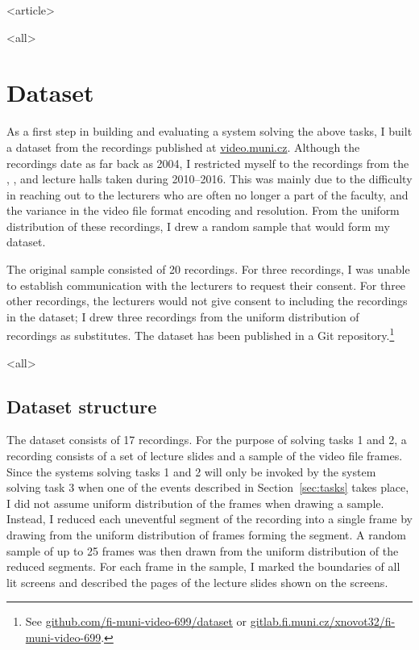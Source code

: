 \mode
<article>


\mode
<all>{%
\section{Dataset}
\label{sec:dataset}}
As a first step in building and evaluating a system solving the above tasks, I
built a dataset from the recordings published at
\href{https://www.video.muni.cz}{video.muni.cz}.
Although the recordings date as far back as 2004, I restricted myself to the
recordings from the , , and  lecture halls taken
during 2010--2016. This was mainly due to the difficulty in reaching out to
the lecturers who are often no longer a part of the faculty, and the variance
in the video file format encoding and resolution. From the uniform distribution
of these recordings, I drew a random sample that would form my dataset.

The original sample consisted of 20 recordings. For three recordings, I was
unable to establish communication with the lecturers to request their consent.
For three other recordings, the lecturers would not give consent to including
the recordings in the dataset; I drew three recordings from the uniform
distribution of recordings as substitutes.
The dataset has been published in a Git repository.\footnote{See
  \href{https://github.com/fi-muni-video-699/dataset}%
       {github.com/fi-muni-video-699/dataset} or
  \href{https://gitlab.fi.muni.cz/xnovot32/fi-muni-video-699}%
       {gitlab.fi.muni.cz/xnovot32/fi-muni-video-699}.}

\mode
<all>{%
\subsection{Dataset structure}}
The dataset consists of 17 recordings. For the purpose of solving tasks 1 and
2, a recording consists of a set of lecture slides and a sample of the video
file frames. Since the systems solving tasks 1 and 2 will only be invoked by
the system solving task 3 when one of the events described in
Section~\ref{sec:tasks} takes place, I did not assume uniform distribution of
the frames when drawing a sample. Instead, I reduced each uneventful segment of
the recording into a single frame by drawing from the uniform distribution of
frames forming the segment. A random sample of up to 25 frames was then drawn
from the uniform distribution of the reduced segments. For each frame in the
sample, I marked the boundaries of all lit screens and described the pages of
the lecture slides shown on the screens.

